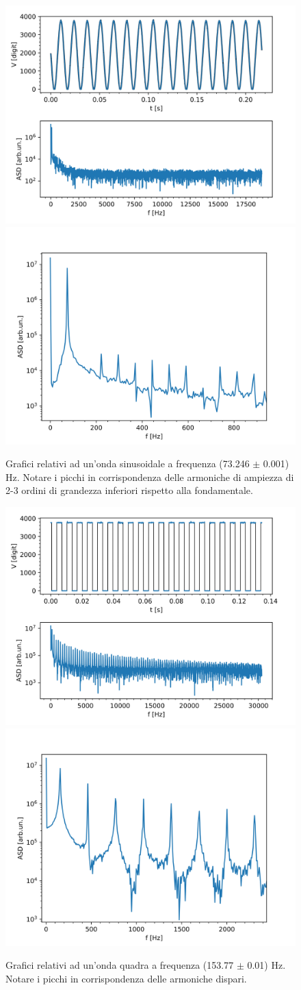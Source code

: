 \documentclass{article}[a4paper, oneside,11pt]
\begin{document}
\begin{figure}[H]
    \centering
    \includegraphics[width=0.45\columnwidth]{img/ese5/f73_SN}
    \includegraphics[width=0.48\columnwidth]{img/ese5/f73_SN-tagl}
    \caption{Grafici relativi ad un'onda sinusoidale a frequenza (73.246 $\pm$ 0.001) Hz. Notare i picchi in corrispondenza delle armoniche di ampiezza di 2-3 ordini di grandezza inferiori rispetto alla fondamentale.}
    \label{fig:ese5-f73_SN}
\end{figure}

\begin{figure}[H]
    \centering
    \includegraphics[width=0.45\columnwidth]{img/ese5/f153_QN}
    \includegraphics[width=0.48\columnwidth]{img/ese5/f153_QN-tagl}
    \caption{Grafici relativi ad un'onda quadra a frequenza (153.77 $\pm$ 0.01) Hz. Notare i picchi in corrispondenza delle armoniche dispari.}
    \label{fig:ese5-f73_QN}
\end{figure}
\end{document}
